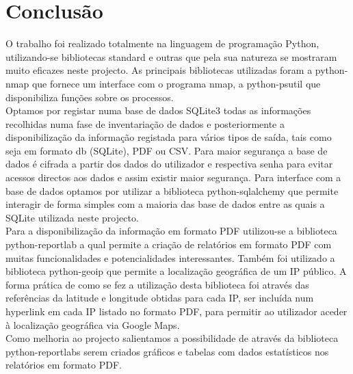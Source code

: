 \documentclass[10pt,journal,cspaper,compsoc]{IEEEtran}
\begin{document}
\section{Conclusão}
O trabalho foi realizado totalmente na linguagem de programação Python, utilizando-se bibliotecas standard e outras que pela sua natureza se mostraram muito eficazes neste projecto. As principais bibliotecas utilizadas foram a python-nmap que fornece um interface com o programa nmap, a python-psutil que disponibiliza funções sobre os processos.\\
Optamos por registar numa base de dados SQLite3 todas as informações recolhidas numa fase de inventariação de dados e posteriormente a disponibilização da informação registada para vários tipos de saída, tais como seja em formato db (SQLite), PDF ou CSV. Para maior segurança a base de dados é cifrada a partir dos dados do utilizador e respectiva senha para evitar acessos directos aos dados e assim existir maior segurança. Para interface com a base de dados optamos por utilizar a biblioteca python-sqlalchemy que permite interagir de forma simples com a maioria das base de dados entre as quais a SQLite utilizada neste projecto.\\
Para a disponibilização da informação em formato PDF utilizou-se a biblioteca python-reportlab a qual permite a criação de relatórios em formato PDF com muitas funcionalidades e potencialidades interessantes.
Também foi utilizado a biblioteca python-geoip que permite a localização geográfica de um IP público. A forma prática de como se fez a utilização desta biblioteca foi através das referências da latitude e longitude obtidas para cada IP, ser incluída num hyperlink em cada IP listado no formato PDF, para permitir ao utilizador aceder à localização geográfica via Google Maps.\\
Como melhoria ao projecto salientamos a possibilidade de através da biblioteca python-reportlabs serem criados gráficos e tabelas com dados estatísticos nos relatórios em formato PDF.
\end{document}
